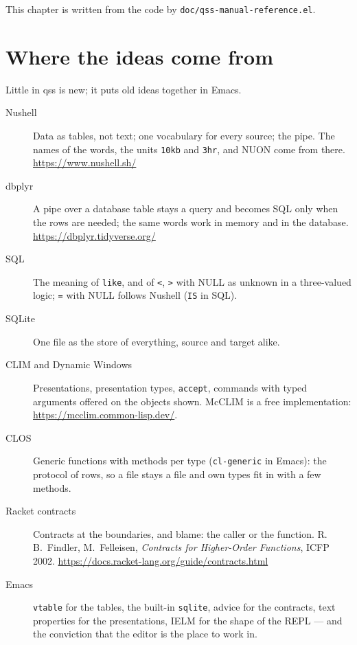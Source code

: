 \documentclass[
  paper=a4, fontsize=11pt, parskip=half, headings=small,
  toc=bibliography, numbers=noenddot, DIV=12
]{scrreprt}
\newcommand{\code}[1]{\texttt{#1}}
\newcommand{\file}[1]{\texttt{#1}}
\newcommand{\qss}{\textsf{qss}}
\begin{document}
This chapter is written from the code by \file{doc/qss-manual-reference.el}.

{\small\sloppy

}

\chapter{Where the ideas come from}

Little in \qss{} is new; it puts old ideas together in Emacs.

\begin{description}
\item[Nushell] Data as tables, not text; one vocabulary for every source; the
  pipe. The names of the words, the units \code{10kb} and \code{3hr}, and NUON
  come from there. \url{https://www.nushell.sh/}
\item[dbplyr] A pipe over a database table stays a query and becomes SQL only
  when the rows are needed; the same words work in memory and in the database.
  \url{https://dbplyr.tidyverse.org/}
\item[SQL] The meaning of \code{like}, and of \code{<}, \code{>} with NULL as
  unknown in a three-valued logic; \code{=} with NULL follows Nushell
  (\code{IS} in SQL).
\item[SQLite] One file as the store of everything, source and target alike.
\item[CLIM and Dynamic Windows] Presentations, presentation types,
  \code{accept}, commands with typed arguments offered on the objects shown.
  McCLIM is a free implementation: \url{https://mcclim.common-lisp.dev/}.
\item[CLOS] Generic functions with methods per type (\code{cl-generic} in Emacs):
  the protocol of rows, so a file stays a file and own types fit in with a few
  methods.
\item[Racket contracts] Contracts at the boundaries, and blame: the caller or
  the function. R.\,B.~Findler, M.~Felleisen, \emph{Contracts for Higher-Order
  Functions}, ICFP 2002.
  \url{https://docs.racket-lang.org/guide/contracts.html}
\item[Emacs] \code{vtable} for the tables, the built-in \code{sqlite}, advice
  for the contracts, text properties for the presentations, IELM for the shape
  of the REPL --- and the conviction that the editor is the place to work in.
\end{description}

\appendix
\end{document}
